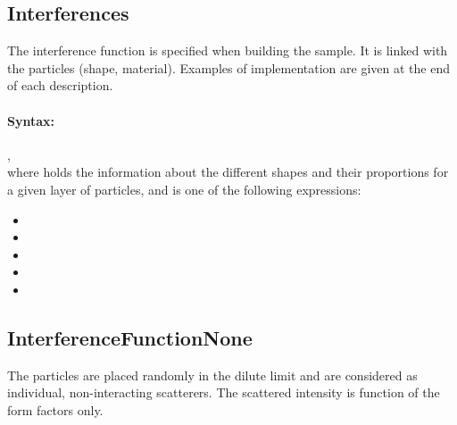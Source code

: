 \subsection{Interferences}

The interference function is specified when building the sample. It is linked with the particles (shape, material). Examples of implementation are given at the end of each description.

\paragraph{Syntax:}
 ,\\ where  holds the information about the different shapes and their proportions for a given layer of particles, and   is one of the following expressions:
\begin{itemize}
\item {}
\item {}
\item {}
\item {}
\item {}
\end{itemize}


\newpage
\subsection{InterferenceFunctionNone}

The particles are placed randomly in the dilute limit and are considered as individual, non-interacting scatterers. The scattered intensity is function of the form factors only.

